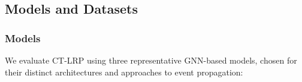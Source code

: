 

\subsection{Models and Datasets}
\subsubsection{Models}
We evaluate CT-LRP using three representative GNN-based models, chosen for their distinct architectures and approaches to event propagation:

